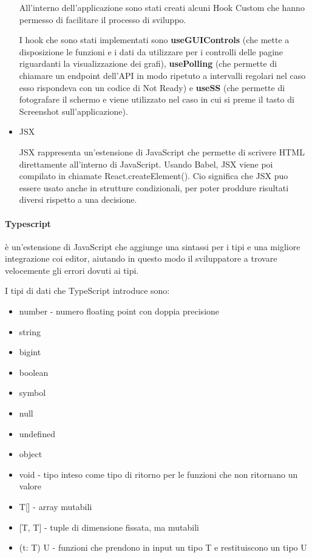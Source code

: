 \documentclass[a4paper,12pt]{report}
\begin{document}
\begin{itemize}
\begin{itemize}
				\end{itemize}
				All'interno dell'applicazione sono stati creati alcuni Hook Custom che hanno permesso di facilitare il processo di sviluppo. 

				I hook che sono stati implementati sono \textbf{useGUIControls} (che mette a disposizione le funzioni e i dati da utilizzare per i controlli delle pagine riguardanti la visualizzazione dei grafi), \textbf{usePolling} (che permette di chiamare un endpoint dell'API in modo ripetuto a intervalli regolari nel caso esso rispondeva con un codice di Not Ready) e \textbf{useSS} (che permette di fotografare il schermo e viene utilizzato nel caso in cui si preme il tasto di Screenshot sull'applicazione).

				\item JSX 

				JSX rappresenta un’estensione di JavaScript che permette di scrivere HTML direttamente all’interno di JavaScript. Usando Babel, JSX viene poi compilato in chiamate React.createElement(). Cio significa che JSX puo essere usato anche in strutture condizionali, per poter proddure risultati diversi rispetto a una decisione. \cite{jsxreact} 

				\end{itemize}
			\paragraph*{Typescript} è un’estensione di JavaScript che aggiunge una sintassi per i tipi e una migliore integrazione coi editor, aiutando in questo modo il sviluppatore a trovare velocemente gli errori dovuti ai tipi. \cite{typescript} 

				I tipi di dati che TypeScript introduce sono:
				\begin{itemize}
				\item number - numero floating point con doppia precisione
				\item string
				\item bigint
 				\item boolean
				\item symbol
				\item null
				\item undefined
				\item object
				\item void - tipo inteso come tipo di ritorno per le funzioni che non ritornano un valore
				\item T[] - array mutabili
				\item {[T, T]} - tuple di dimensione fissata, ma mutabili
				\item (t: T) U - funzioni che prendono in input un tipo T e restituiscono un tipo U
				\end{itemize}
\end{document}
